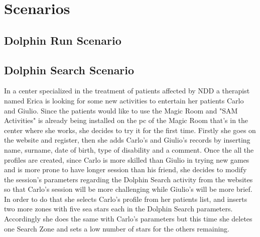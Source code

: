 \section{Scenarios}
\subsection{Dolphin Run Scenario}
\subsection{Dolphin Search Scenario}
In a center specialized in the treatment of patients affected by NDD a therapist named Erica is looking for some new activities to entertain her patients Carlo and Giulio.
Since the patients would like to use the Magic Room and "SAM Activities" is already being installed on the pc of the Magic Room that's in the center where she works, she decides to try it for the first time.
Firstly she goes on the website and register, then she adds Carlo's and Giulio's records by inserting name, surname, date of birth, type of disability and a comment.
Once the all the profiles are created, since Carlo is more skilled than Giulio in trying new games and is more prone to have longer session than his friend, she decides to modify the session's parameters regarding the Dolphin Search activity from the websites so that Carlo's session will be more challenging while Giulio's will be more brief. In order to do that she selects Carlo's profile from her patients list, and inserts two more zones with five sea stars each in the Dolphin Search parameters. Accordingly she does the same with Carlo's parameters but this time she deletes one Search Zone and sets a low number of stars for the others remaining.